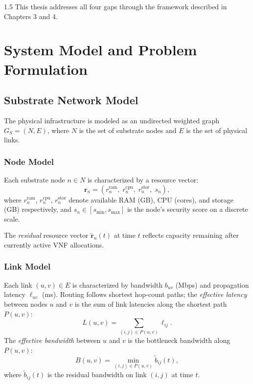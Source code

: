 \documentclass[A4paper,12pt]{report}
\theoremstyle{plain}
\theoremstyle{definition}
\theoremstyle{remark}
\numberwithin{equation}{section}
\begin{document}
\begin{spacing}{1.5}
This thesis addresses all four gaps through the framework described in Chapters 3 and 4.

\chapter{System Model and Problem Formulation}

\section{Substrate Network Model}

The physical infrastructure is modeled as an undirected weighted graph $G_S = (N, E)$, where $N$ is the set of substrate nodes and $E$ is the set of physical links.

\subsection{Node Model}

Each substrate node $n \in N$ is characterized by a resource vector:
\begin{equation}
\mathbf{r}_n = \left(r_n^{\text{ram}},\; r_n^{\text{cpu}},\; r_n^{\text{stor}},\; s_n\right),
\end{equation}
where $r_n^{\text{ram}}$, $r_n^{\text{cpu}}$, $r_n^{\text{stor}}$ denote available RAM (GB), CPU (cores), and storage (GB) respectively, and $s_n \in [s_{\min}, s_{\max}]$ is the node's security score on a discrete scale.

The \textit{residual} resource vector $\tilde{\mathbf{r}}_n(t)$ at time $t$ reflects capacity remaining after currently active VNF allocations.

\subsection{Link Model}

Each link $(u,v) \in E$ is characterized by bandwidth $b_{uv}$ (Mbps) and propagation latency $\ell_{uv}$ (ms). Routing follows shortest hop-count paths; the \textit{effective latency} between nodes $u$ and $v$ is the sum of link latencies along the shortest path $P(u,v)$:
\begin{equation}
L(u,v) = \sum_{(i,j) \in P(u,v)} \ell_{ij}.
\end{equation}
The \textit{effective bandwidth} between $u$ and $v$ is the bottleneck bandwidth along $P(u,v)$:
\begin{equation}
B(u,v) = \min_{(i,j) \in P(u,v)} \tilde{b}_{ij}(t),
\end{equation}
where $\tilde{b}_{ij}(t)$ is the residual bandwidth on link $(i,j)$ at time $t$.


\end{spacing}
\end{document}
